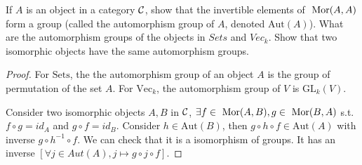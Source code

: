 \begin{exr}
If $A$ is an object in a category ${\cal C}$, show that the invertible elements of $\text{ Mor}(A, A)$ form a group (called the automorphism group of $A$, denoted $\text{Aut}(A)$). What are the automorphism groups of the objects in $\mathit{Sets}$ and $\mathit{Vec}_k$. Show that two isomorphic objects have the same automorphism groups.
\end{exr}
\begin{proof}
For $\text{Sets}$, the the automorphism group of an object $A$ is the group of permutation of the set $A$. For $\text{Vec}_k$, the automorphism group of $V$ is $\text{GL}_k(V)$. 

Consider two isomorphic objects $A,B$ in ${\cal C}$, $\exists f\in \text{ Mor}(A,B), g\in\text{ Mor}(B,A)$ s.t. $f\circ g=id_A$ and $g\circ f=id_B$. Consider $h\in\text{Aut}(B)$, then $g\circ h\circ f\in \text{Aut}(A)$ with inverse $g\circ h^{-1} \circ f$. We can check that it is a isomorphism of groups. It has an inverse $[\forall j\in Aut(A),j\longmapsto g\circ j\circ f]$.
\end{proof}

